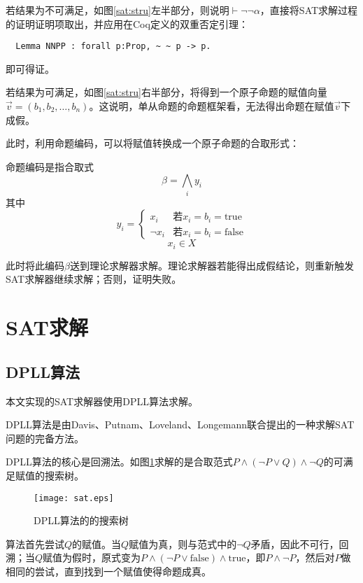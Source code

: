 若结果为不可满足，如图\ref{sat:stru}左半部分，则说明$\vdash \lnot \lnot \alpha$，直接将SAT求解过程的证明证明项取出，并应用在Coq定义的双重否定引理：
\begin{verbatim}
  Lemma NNPP : forall p:Prop, ~ ~ p -> p.
\end{verbatim}
即可得证。

若结果为可满足，如图\ref{sat:stru}右半部分，将得到一个原子命题的赋值向量$\vec{v}=(b_1, b_2, \dots , b_n)$。这说明，单从命题的命题框架看，无法得出命题在赋值$\vec{v}$下成假。

此时，利用命题编码，可以将赋值转换成一个原子命题的合取形式：
\begin{definition}[命题编码]命题编码是指合取式
  $$\beta = \bigwedge_i y_i$$
  其中
  \begin{equation*}
    y_i =
    \begin{cases}
      x_i & \text{若}x_i = b_i = \mathrm{true} \\
      \lnot x_i & \text{若}x_i = b_i = \mathrm{false}
    \end{cases}
  \end{equation*}
  $$ x_i \in X $$
\end{definition}


此时将此编码$\beta$送到理论求解器求解。理论求解器若能得出成假结论，则重新触发SAT求解器继续求解；否则，证明失败。

\section{SAT求解}
\subsection{DPLL算法}
本文实现的SAT求解器使用DPLL算法求解。

DPLL算法是由Davis、Putnam、Loveland、Longemann联合提出的一种求解SAT问题的完备方法。

DPLL算法的核心是回溯法。如图\ref{sat:dpll}求解的是合取范式$P \land (\lnot P \lor Q) \land \lnot Q$的可满足赋值的搜索树。

\begin{figure}[!htbp]
  \centering
  \texttt{[image: sat.eps]}
  \caption{DPLL算法的的搜索树}
  \label{sat:dpll}
\end{figure}

算法首先尝试$Q$的赋值。当$Q$赋值为真，则与范式中的$\lnot Q$矛盾，因此不可行，回溯；当$Q$赋值为假时，原式变为$P \land (\lnot P \lor \mathrm{false}) \land \mathrm{true}$，即$P \land \lnot P$，然后对$P$做相同的尝试，直到找到一个赋值使得命题成真。

